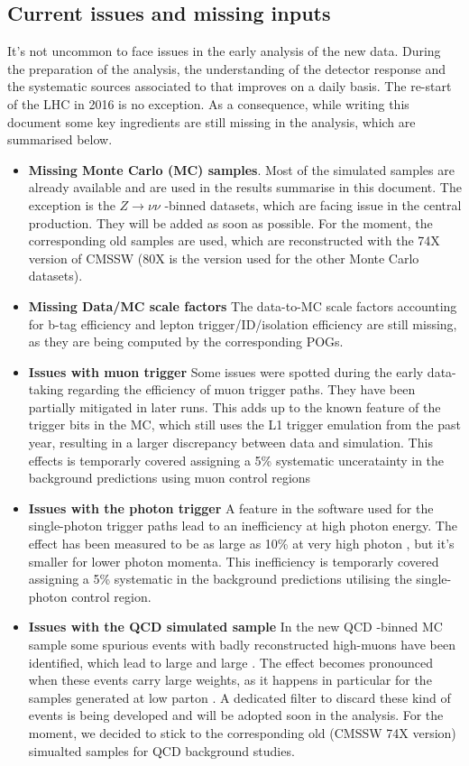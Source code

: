 \subsection{Current issues and missing inputs}
It's not uncommon to face issues in the early analysis of the new data. 
During the preparation of the analysis, the understanding of the detector response and 
the systematic sources associated to that improves on a daily basis. 
The re-start of the LHC in 2016 is no exception. 
As a consequence, while writing this document some key ingredients are still missing in the analysis, 
which are summarised below.
\begin{itemize}
\item \textbf{Missing Monte Carlo (MC) samples}. Most of the simulated samples are already available and are used in the results summarise in this document. 
The exception is the $Z\rightarrow\nu\nu$ \scalht-binned datasets, which are facing issue in the central production. They will be added as soon as possible. 
For the moment, the corresponding old samples are used, which are reconstructed with the 74X version of CMSSW (80X is the version used for the other Monte Carlo datasets). 
\item \textbf{Missing Data/MC scale factors} The data-to-MC scale factors accounting for b-tag efficiency and lepton trigger/ID/isolation efficiency are 
still missing, as they are being computed by the corresponding POGs. 
\item \textbf{Issues with muon trigger} Some issues were spotted during the early data-taking regarding the efficiency of muon trigger paths. 
They have been partially mitigated in later runs. This adds up to the known feature of the trigger bits in the MC, which still uses the L1 trigger emulation from the past year, resulting 
in a larger discrepancy between data and simulation. This effects is temporarly covered assigning a 5\% systematic unceratainty in the background predictions 
using muon control regions
\item \textbf{Issues with the photon trigger} A feature in the software used for the single-photon trigger paths lead to an inefficiency at 
high photon energy. The effect has been measured to be as large as 10\% at very high photon \pt, but it's smaller for lower photon momenta. 
This inefficiency is temporarly covered assigning a 5\% systematic in the background predictions utilising the single-photon control region.
\item \textbf{Issues with the QCD simulated sample} In the new QCD \scalht-binned MC sample some spurious events with 
badly reconstructed high-\pt muons have been identified, which lead to large \MET and large \scalht. 
The effect becomes pronounced when these events carry large weights, as it happens in particular for the samples generated at low parton \scalht. 
A dedicated filter to discard these kind of events is being developed and will be adopted soon in the analysis. 
For the moment, we decided to stick to the corresponding old (CMSSW 74X version) simualted samples for QCD background studies. 
\end{itemize}


